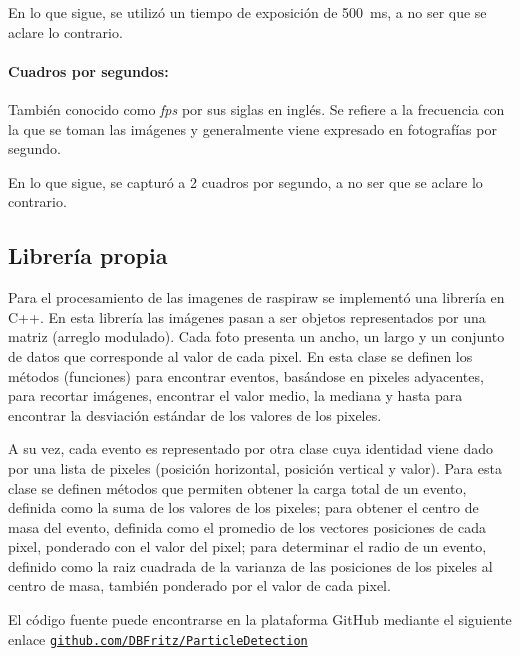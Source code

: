 \documentclass[twoside,twocolumn]{article}
\begin{document}
        En lo que sigue, se utilizó un tiempo de exposición de \SI{500}{\milli\second}, a no ser que se aclare lo contrario.

      \paragraph{Cuadros por segundos:}
        También conocido como \emph{fps} por sus siglas en inglés.
        Se refiere a la frecuencia con la que se toman las imágenes y generalmente viene expresado en fotografías por segundo.
        
        En lo que sigue, se capturó a 2 cuadros por segundo, a no ser que se aclare lo contrario.


    \subsection{Librería propia}\label{sec:conf_exp:library}
      Para el procesamiento de las imagenes de raspiraw se implementó una librería en C++. En esta librería las imágenes pasan
      a ser objetos representados por una matriz (arreglo modulado). Cada foto presenta un ancho, un largo y un conjunto de datos que
      corresponde al valor de cada pixel. En esta clase se definen los métodos (funciones) para encontrar eventos, basándose en
      pixeles adyacentes, para recortar imágenes, encontrar el valor medio, la mediana y hasta para encontrar
      la desviación estándar de los valores de los pixeles.

      A su vez, cada evento es representado por otra clase cuya identidad viene dado por una lista de pixeles (posición horizontal,
      posición vertical y valor). Para esta clase se definen métodos que permiten
      obtener la carga total de un evento, definida como la suma de los valores de los pixeles;
      para obtener el centro de masa del evento,
      definida como el promedio de los vectores posiciones de cada pixel,
      ponderado con el valor del pixel;
      para determinar el radio de un evento, definido como la raiz cuadrada de la varianza de las posiciones
      de los pixeles al centro de masa, también ponderado por el valor de cada pixel.

      El código fuente puede encontrarse en la plataforma GitHub mediante el siguiente enlace
      \href{https://github.com/DBFritz/ParticleDetections}{\texttt{github.com/DBFritz/ParticleDetection}}
\end{document}
